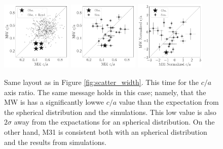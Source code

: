 \documentclass[a4paper,fleqn,usenatbib]{mnras}
\begin{document}
\begin{figure}
\centering
\includegraphics[width=0.30\textwidth]{scatter_random_ranked_ca_ratio.pdf}
\includegraphics[width=0.30\textwidth]{scatter_ranked_illudm_ca_ratio.pdf}
\includegraphics[width=0.30\textwidth]{scatter_norm_ranked_illudm_ca_ratio.pdf}
\caption{Same layout as in Figure \ref{fig:scatter_width}. 
This time for the $c/a$ axis ratio. 
The same message holds in this case; namely, that 
the MW is has a significantly lowwe $c/a$ value than the
expectation from the spherical distribution and the simulations. 
This low value is also $2\sigma$ away from the expactations for an
spherical distribution.
On the other hand, M31 is consistent both with an spherical
distribution and the results from simulations.
\label{fig:scatter_ca_ratio}}
\end{figure}
\end{document}

